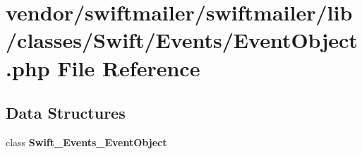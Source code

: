 \section{vendor/swiftmailer/swiftmailer/lib/classes/\+Swift/\+Events/\+Event\+Object.php File Reference}
\label{_event_object_8php}
\subsection*{Data Structures}
\begin{DoxyCompactItemize}
\item 
class {\bf Swift\+\_\+\+Events\+\_\+\+Event\+Object}
\end{DoxyCompactItemize}
